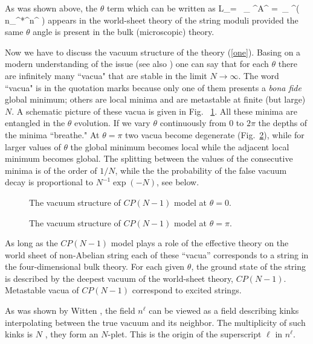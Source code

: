 As was shown above, the $\theta$ term which
can be written as
\beq
{\cal L}_\theta = \frac{\theta}{2\pi }\, \varepsilon_{\alpha\gamma} 
\partial^\alpha A^\gamma
=\frac{\theta}{2\pi }\, \varepsilon_{\alpha\gamma} \partial^\alpha \left(
n_{\ell}^*\partial^\gamma n^{\ell}
\right)
\label{two}
\eeq
appears in the world-sheet theory of the string moduli provided the same $\theta$ angle
is present in the bulk (microscopic) theory.

Now we have to discuss the vacuum structure of the
theory (\ref{one}). Basing on a modern understanding of the
issue \cite{nvacym} (see also \cite{nvacymp}) one can say that for each $\theta$ there are
infinitely many ``vacua" that are stable in the limit $N\to \infty$.
The word ``vacua" is in the quotation marks because
only one of them presents a {\em bona fide}
global minimum; others are local minima and are metastable at
finite (but large) $N$. A schematic picture of these vacua
is given in Fig. ~\ref{odin}. All  these minima are entangled in the $\theta$ evolution.
If we vary $\theta$ continuously from $0$ to $2\pi$ the
depths of the minima ``breathe." At $\theta =\pi$ two vacua become degenerate 
(Fig.~\ref{dva}), while for larger values of $\theta$ the global minimum 
becomes local while the adjacent local minimum becomes global.
The splitting between the values of the consecutive minima
is of the order of $1/N$, while the
the probability of the false vacuum decay is proportional to
$N^{-1}\exp (-N)$, see below.


\begin{figure}
\epsfxsize=6cm
\centerline{}
\caption{
The vacuum structure of 
$CP(N-1)$ model at $\theta =0$.}
\label{odin}
\end{figure}

\begin{figure}
\epsfxsize=6cm
\centerline{}
\caption{
The vacuum structure of 
$CP(N-1)$ model at $\theta = \pi$.}
\label{dva}
\end{figure}

As long as the $CP(N-1)$ model plays a role of the effective theory on the
world sheet of non-Abelian string each of these ``vacua'' corresponds to
a  string in the four-dimensional bulk theory.
For each given $\theta$,  the ground state of the string
is described by the deepest vacuum of the world-sheet
theory, $CP(N-1)$. Metastable vacua of $CP(N-1)$
correspond to excited strings.

As was shown by Witten \cite{5}, 
the field $n^{\ell}$ can be viewed as a field describing kinks interpolating 
between the true vacuum and its neighbor. The multiplicity of 
such kinks is $N$ \cite{Acharya}, they form an $N$-plet. This is 
the origin of the superscript $\ell$ in $n^{\ell}$.
 
